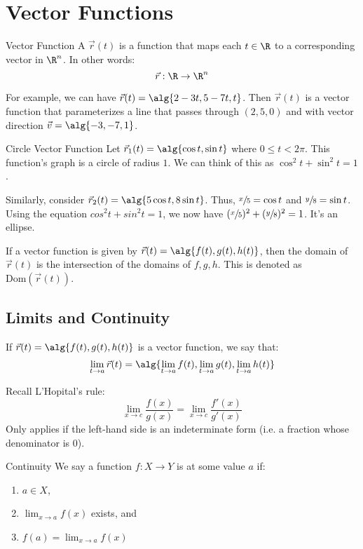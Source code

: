 \chapter{Vector Functions}

\begin{dfnbox}{Vector Function}{}
    A  $\vec{r}(t)$ is a function that maps each $t \in \R$ to a corresponding vector in $\R^n$. In other words:
    \[ \vec{r} : \R \to \R^n \]
\end{dfnbox}

For example, we can have $\vec{r}(t) = \alg{2-3t, 5-7t, t}$. Then $\vec{r}(t)$ is a vector function that parameterizes a line that passes through $(2,5,0)$ and with vector direction $\vec{v} = \alg{-3, -7, 1}$.

\begin{exbox}{Circle Vector Function}{}
    Let $\vec{r}_1(t) = \alg{ \cos t, \sin t}$ where $0 \leq t < 2\pi$. This function's graph is a circle of radius $1$. We can think of this as $\cos^2 t + \sin^2 t = 1$.

    Similarly, consider $\vec{r}_2(t) = \alg{ 5 \cos t, 8 \sin t }$. Thus, $\sfrac{x}{5} = \cos t$ and $\sfrac{y}{8} = \sin{t}$. Using the equation $cos^2 t + sin^2 t = 1$, we now have $(\sfrac{x}{5})^2 + (\sfrac{y}{8})^2 = 1$. It's an ellipse.
\end{exbox}

If a vector function is given by $\vec{r}(t) = \alg{f(t), g(t), h(t)}$, then the domain of $\vec{r}(t)$ is the intersection of the domains of $f,g,h$. This is denoted as $\text{Dom}(\vec{r}(t))$.

\section{Limits and Continuity}
If $\vec{r}(t) = \alg{f(t), g(t), h(t)}$ is a vector function, we say that:
\[ \lim_{t \to a} \vec{r}(t) = \alg{ \lim_{t \to a} f(t), \lim_{t \to a} g(t), \lim_{t \to a} h(t) } \]

\begin{notebox}
    Recall L'Hopital's rule:
    \[ \lim_{x \to c} \frac{f(x)}{g(x)} = \lim_{x \to c} \frac{f\prime(x)}{g\prime(x)} \]
    Only applies if the left-hand side is an indeterminate form (i.e. a fraction whose denominator is $0$).
\end{notebox}

\begin{dfnbox}{Continuity}{}
    We say a function $f : X \to Y$ is  at some value $a$ if:
    \begin{enumerate}[noitemsep]
        \item $a \in X$,
        \item $\lim_{x \to a} f(x)$ exists, and
        \item $f(a) = \lim_{x \to a} f(x)$
    \end{enumerate}
\end{dfnbox}

